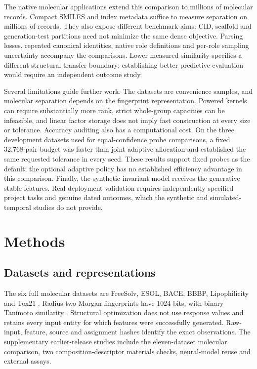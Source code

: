 \documentclass[12pt]{article}
\begin{document}
The native molecular applications extend this comparison to millions of
molecular records. Compact SMILES and index metadata suffice to measure
separation on millions of records. They also expose different benchmark aims:
CID, scaffold and generation-test partitions need not minimize the same dense
objective. Parsing losses, repeated canonical identities, native role definitions
and per-role sampling uncertainty accompany the comparisons. Lower measured
similarity specifies a different structural transfer boundary; establishing
better predictive evaluation would require an independent outcome study.

Several limitations guide further work. The datasets are convenience samples,
and molecular separation depends on the fingerprint representation. Powered
kernels can require substantially more rank, strict whole-group capacities can
be infeasible, and linear factor storage does not imply fast construction at
every size or tolerance. Accuracy auditing also has a computational cost. On
the three development datasets used for equal-confidence probe comparisons, a
fixed 32,768-pair budget was faster than joint adaptive allocation and
established the same requested tolerance in every seed. These results support
fixed probes as the default; the optional adaptive policy has no established
efficiency advantage in this comparison. Finally, the synthetic invariant model
receives the generative stable features. Real deployment validation requires
independently specified project tasks and genuine dated outcomes, which the
synthetic and simulated-temporal studies do not provide.

\clearpage
\section{Methods}
\label{sec:methods}

\subsection{Datasets and representations}

The six full molecular datasets are FreeSolv, ESOL, BACE, BBBP, Lipophilicity
and Tox21 \citep{wu2018moleculenet}. Radius-two Morgan fingerprints have 1024
bits, with binary Tanimoto similarity \citep{rogers2010fingerprints,ralai2005}.
Structural optimization does not use response values and retains every input
entity for which features were successfully generated. Raw-input, feature,
source and assignment hashes identify the exact observations. The supplementary
earlier-release studies include the eleven-dataset molecular comparison, two
composition-descriptor materials checks, neural-model reuse and external
assays.
\end{document}
